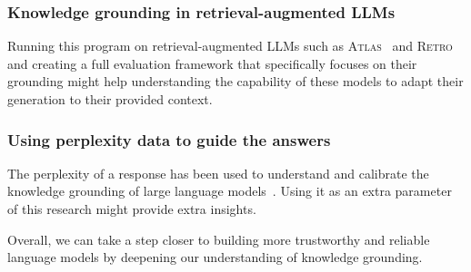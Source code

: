 \subsubsection{Knowledge grounding in retrieval-augmented LLMs}
Running this program on retrieval-augmented LLMs such as \textsc{Atlas}~\cite{atlas_foundational} and \textsc{Retro}~\cite{retro} and creating a full evaluation framework that specifically focuses on their grounding might help understanding the capability of these models to adapt their generation to their provided context.

\subsubsection{Using perplexity data to guide the answers}
The perplexity of a response has been used to understand and calibrate the knowledge grounding of large language models~\cite{how_can_we_know}.
Using it as an extra parameter of this research might provide extra insights.

Overall, we can take a step closer to building more trustworthy and reliable language models by deepening our understanding of knowledge grounding.
